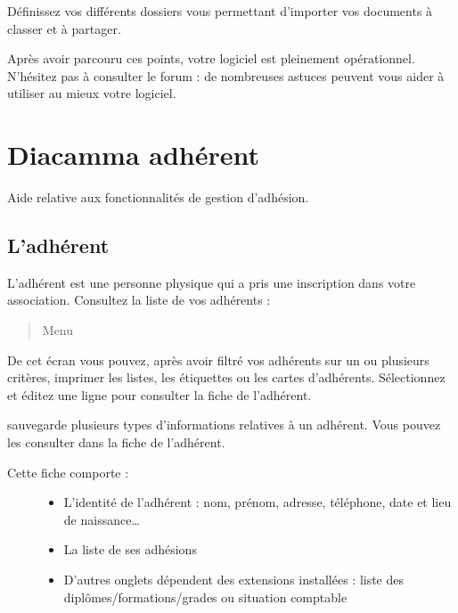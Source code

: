 \documentclass[a4paper,10pt,oneside,french]{sphinxmanual}
\begin{document}
Définissez vos différents dossiers vous permettant d’importer vos documents à classer et à partager.

Après avoir parcouru ces points, votre logiciel  est pleinement opérationnel.
N’hésitez pas à consulter le forum : de nombreuses astuces peuvent vous aider à utiliser au mieux votre logiciel.


\chapter{Diacamma adhérent}
\label{\detokenize{member/index:diacamma-adherent}}\label{\detokenize{member/index::doc}}
Aide relative aux fonctionnalités de gestion d’adhésion.


\section{L’adhérent}
\label{\detokenize{member/member:ladherent}}\label{\detokenize{member/member::doc}}
L’adhérent est une personne physique qui a pris une inscription dans votre association.
Consultez la liste de vos adhérents :
\begin{quote}

Menu 
\end{quote}

\noindent{}

De cet écran vous pouvez, après avoir filtré vos adhérents sur un ou plusieurs critères, imprimer les listes, les étiquettes ou les cartes d’adhérents.
Sélectionnez et éditez une ligne pour consulter la fiche de l’adhérent.

 sauvegarde plusieurs types d’informations relatives à un adhérent. Vous pouvez les consulter dans la fiche de l’adhérent.

\noindent{}
\begin{description}
\item[{Cette fiche comporte :}] \leavevmode\begin{itemize}
\item {} 
L’identité de l’adhérent : nom, prénom, adresse, téléphone, date et lieu de naissance…

\item {} 
La liste de ses adhésions

\item {} 
D’autres onglets dépendent des extensions installées : liste des diplômes/formations/grades ou situation comptable

\end{itemize}

\end{description}
\end{document}
